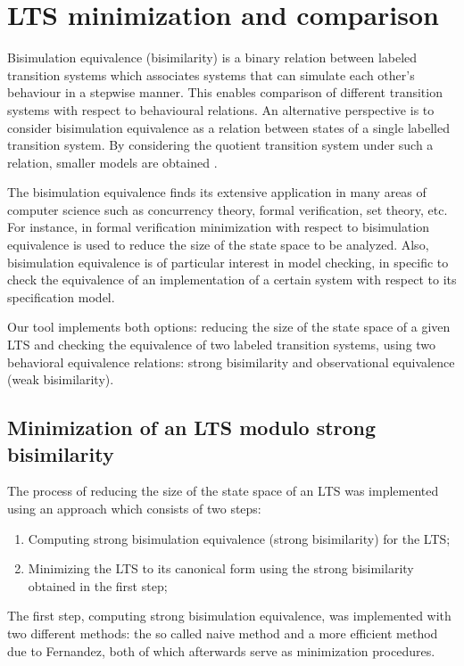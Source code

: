 \section{LTS minimization and comparison}
Bisimulation equivalence (bisimilarity) is a binary relation between labeled transition systems which associates systems that can simulate each other's behaviour in a stepwise manner. This enables comparison of different transition systems with respect to behavioural relations. An alternative perspective is to consider bisimulation equivalence as a relation between states of a single labelled transition system. By considering the quotient transition system under such a relation, smaller models are obtained \cite{ModelChecking}.

The bisimulation equivalence finds its extensive application in many areas of computer science such as concurrency theory, formal verification, set theory, etc. For instance, in formal verification minimization with respect to bisimulation equivalence is used to reduce the size of the state space to be analyzed. Also, bisimulation equivalence is of particular interest in model checking, in specific to check the equivalence of an implementation of a certain system with respect to its specification model.

Our tool implements both options: reducing the size of the state space of a given LTS and checking the equivalence of two labeled transition systems, using two behavioral equivalence relations: strong bisimilarity and observational equivalence (weak bisimilarity).

\subsection{Minimization of an LTS modulo strong bisimilarity}
The process of reducing the size of the state space of an LTS was implemented using an approach which consists of two steps:
\begin{enumerate}
\item Computing strong bisimulation equivalence (strong bisimilarity) for the LTS;
\item Minimizing the LTS to its canonical form using the strong bisimilarity obtained in the first step;
\end{enumerate}

The first step, computing strong bisimulation equivalence, was implemented with two different methods: the so called
naive method and a more efficient method due to Fernandez, both of which afterwards serve as minimization procedures.

